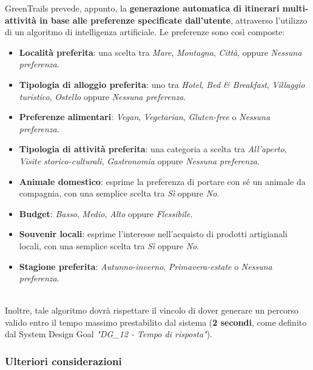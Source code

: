 \documentclass{CSUniSchoolLabReport}
\begin{document}
GreenTrails prevede, appunto, la \textbf{generazione automatica di itinerari multi-attività in base alle preferenze specificate dall'utente}, attraverso l'utilizzo di un algoritmo di intelligenza artificiale. Le preferenze sono così composte:
\begin{itemize}
    \item \textbf{Località preferita}: una scelta tra \textit{Mare}, \textit{Montagna}, \textit{Città}, oppure \textit{Nessuna preferenza}.
    \item \textbf{Tipologia di alloggio preferita}: uno tra \textit{Hotel}, \textit{Bed \& Breakfast}, \textit{Villaggio turistico}, \textit{Ostello} oppure \textit{Nessuna preferenza}.
    \item \textbf{Preferenze alimentari}: \textit{Vegan}, \textit{Vegetarian}, \textit{Gluten-free} o \textit{Nessuna preferenza}.
    \item \textbf{Tipologia di attività preferita}: una categoria a scelta tra \textit{All'aperto}, \textit{Visite storico-culturali}, \textit{Gastronomia} oppure \textit{Nessuna preferenza}.
    \item \textbf{Animale domestico}: esprime la preferenza di portare con sé un animale da compagnia, con una semplice scelta tra \textit{Sì} oppure \textit{No}.
    \item \textbf{Budget}: \textit{Basso}, \textit{Medio}, \textit{Alto} oppure \textit{Flessibile}.
    \item \textbf{Souvenir locali}: esprime l'interesse nell'acquisto di prodotti artigianali locali, con una semplice scelta tra \textit{Sì} oppure \textit{No}.
    \item \textbf{Stagione preferita}: \textit{Autunno-inverno}, \textit{Primavera-estate} o \textit{Nessuna preferenza}.
\end{itemize}
~\\
Inoltre, tale algoritmo dovrà rispettare il vincolo di dover generare un percorso valido entro il tempo massimo prestabilito dal sistema (\textbf{2 secondi}, come definito dal System Design Goal \textit{"DG\_12 - Tempo di risposta"}).


\subsubsection{Ulteriori considerazioni}
\end{document}
